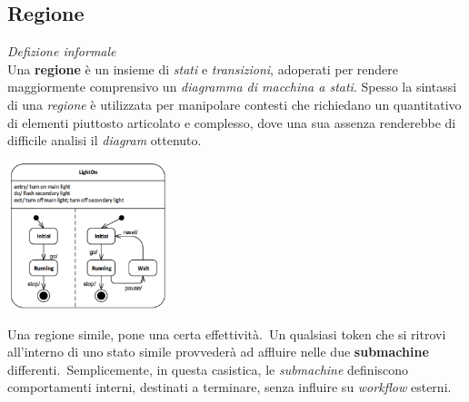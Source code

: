 \documentclass{article}
\begin{document}
\subsection*{Regione}
\large 
\textit{Defizione informale}\\Una \textbf{regione} è un insieme di \textit{stati} e \textit{transizioni}, adoperati per rendere maggiormente comprensivo un \textit{diagramma di macchina a stati}.
Spesso la sintassi di una \textit{regione} è utilizzata per manipolare contesti che richiedano un quantitativo di elementi piuttosto articolato e complesso, dove una sua assenza renderebbe di difficile analisi il \textit{diagram} ottenuto.\vspace*{7pt}
\begin{center}
    \includegraphics*[width=0.35\textwidth]{foto 9.png}
\end{center}
Una regione simile, pone una certa effettività.\ Un qualsiasi token che si ritrovi all'interno di uno stato simile provvederà ad affluire nelle due \textbf{submachine} differenti.\ Semplicemente, in questa casistica, le \textit{submachine} definiscono comportamenti interni, destinati a terminare, senza influire su \textit{workflow} esterni.
\end{document}
